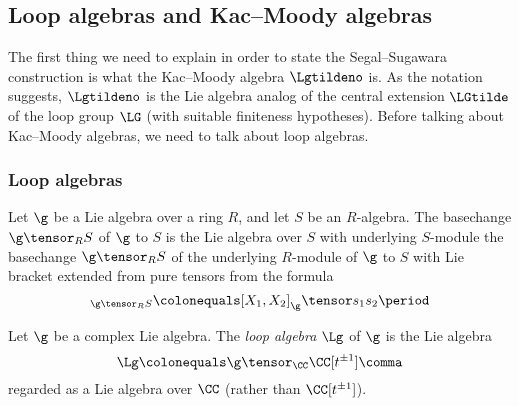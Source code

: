
\subsection{Loop algebras and Kac--Moody algebras}\label{sec:KacMoody}

The first thing we need to explain in order to state the Segal--Sugawara construction is what the Kac--Moody algebra $ \Lgtildeno $ is.
As the notation suggests, $ \Lgtildeno $ is the Lie algebra analog of the central extension $ \LGtilde $ of the loop group $ \LG $ (with suitable finiteness hypotheses).
Before talking about Kac--Moody algebras, we need to talk about loop algebras.


\subsubsection{Loop algebras}\label{subsec:loops}

\begin{recollection}
	Let $ \g $ be a Lie algebra over a ring $ R $, and let $ S $ be an $ R $-algebra.
	The basechange $ \g \tensor_R S $ of $ \g $ to $ S $ is the Lie algebra over $ S $ with underlying $ S $-module the basechange $ \g \tensor_R S $ of the underlying $ R $-module of $ \g $ to $ S $ with Lie bracket extended from pure tensors from the formula
	\begin{equation*}
		[X_1 \tensor s_1, X_2 \tensor s_2]_{\g \tensor_R S} \colonequals [X_1,X_2]_{\g} \tensor s_1 s_2 \period 
	\end{equation*}
\end{recollection}

\begin{definition}
	Let $ \g $ be a complex Lie algebra.
	The \textit{loop algebra} $ \Lg $ of $ \g $ is the Lie algebra
	\begin{equation*}
		\Lg \colonequals \g \tensor_{\CC} \CC[t^{\pm 1}] \comma
	\end{equation*}
	regarded as a Lie algebra over $ \CC $ (rather than $ \CC[t^{\pm 1}] $).
\end{definition}

